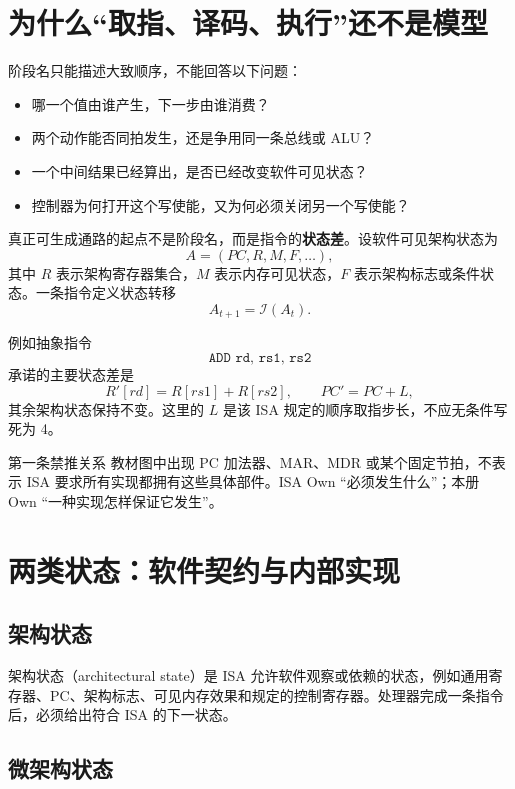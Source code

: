 \documentclass[UTF8,fontset=fandol,11pt,a4paper]{ctexart}
\newcommand{\kw}[1]{\textbf{\color{deep}#1}}
\newcommand{\code}[1]{\texttt{#1}}
\begin{document}
\tableofcontents
\newpage

\section{为什么“取指、译码、执行”还不是模型}

阶段名只能描述大致顺序，不能回答以下问题：
\begin{itemize}
  \item 哪一个值由谁产生，下一步由谁消费？
  \item 两个动作能否同拍发生，还是争用同一条总线或 ALU？
  \item 一个中间结果已经算出，是否已经改变软件可见状态？
  \item 控制器为何打开这个写使能，又为何必须关闭另一个写使能？
\end{itemize}

真正可生成通路的起点不是阶段名，而是指令的\kw{状态差}。设软件可见架构状态为
\[
A=(PC,R,M,F,\ldots),
\]
其中 $R$ 表示架构寄存器集合，$M$ 表示内存可见状态，$F$ 表示架构标志或条件状态。一条指令定义状态转移
\[
A_{t+1}=\mathcal{I}(A_t).
\]

例如抽象指令
\[
\code{ADD rd, rs1, rs2}
\]
承诺的主要状态差是
\[
R'[rd]=R[rs1]+R[rs2],\qquad PC'=PC+L,
\]
其余架构状态保持不变。这里的 $L$ 是该 ISA 规定的顺序取指步长，不应无条件写死为 4。

\begin{warnbox}{第一条禁推关系}
教材图中出现 PC 加法器、MAR、MDR 或某个固定节拍，不表示 ISA 要求所有实现都拥有这些具体部件。ISA Own ``必须发生什么''；本册 Own ``一种实现怎样保证它发生''。
\end{warnbox}

\section{两类状态：软件契约与内部实现}

\subsection{架构状态}

架构状态（architectural state）是 ISA 允许软件观察或依赖的状态，例如通用寄存器、PC、架构标志、可见内存效果和规定的控制寄存器。处理器完成一条指令后，必须给出符合 ISA 的下一状态。

\subsection{微架构状态}
\end{document}
